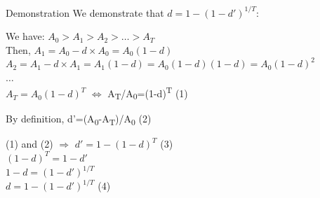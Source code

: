 \documentclass[10pt,table,dvipsnames,compress]{beamer}
\begin{document}
\begin{frame}[label={sec:orgec868dd}]{Demonstration}
We demonstrate that \alert{\alert{\(d = 1 - (1 - d')^{1/T}\)}}: \\
\vspace{0.25cm}

We have: \(A_0 > A_1 > A_2 > \ldots > A_T\) \\
Then, \(A_1 = A_0 - d \times A_0 = A_0 (1-d)\) \\
\(A_2 = A_1 - d \times A_1 = A_1 (1-d) = A_0 (1-d) (1-d) = A_0 (1-d)^2\) \\
\(\ldots\) \\
\(A_T = A_0 (1-d)^T\) \(\Leftrightarrow\) A\textsubscript{T}/A\textsubscript{0}=(1-d)\textsuperscript{T} \alert{\alert{(1)}} \\
\vspace{0.25cm}

By definition, d'=(A\textsubscript{0}-A\textsubscript{T})/A\textsubscript{0} \alert{\alert{(2)}} \\
\vspace{0.25cm}

\alert{\alert{(1)}} and \alert{\alert{(2)}} \(\Rightarrow\) \(d' = 1 - (1-d)^T\) \alert{\alert{(3)}} \\
\((1-d)^T = 1-d'\) \\
\(1-d = (1-d')^{1/T}\) \\
\alert{\alert{\(d = 1 - (1 - d')^{1/T}\) (4)}}
\end{frame}

\end{document}
